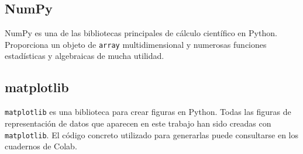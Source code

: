 \subsection*{NumPy}
NumPy es una de las bibliotecas principales de cálculo científico en Python. Proporciona un objeto de \texttt{array} multidimensional y numerosas funciones estadísticas y algebraicas de mucha utilidad.

\subsection*{matplotlib}
\texttt{matplotlib} es una biblioteca para crear figuras en Python. Todas las figuras de representación de datos que aparecen en este trabajo han sido creadas con \texttt{matplotlib}. El código concreto utilizado para generarlas puede consultarse en los cuadernos de Colab.
